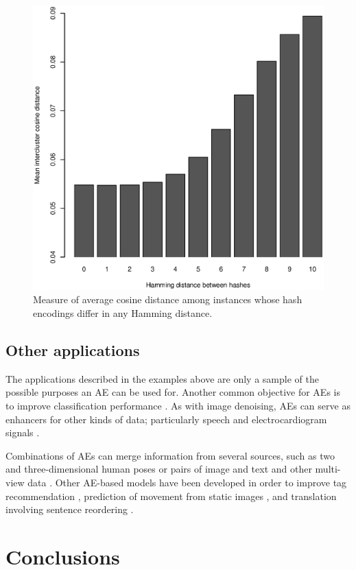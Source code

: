 \begin{figure}[ht]
    \centering
    \includegraphics[width=.75\textwidth]{hashing_intercluster.eps}
    \caption{Measure of average cosine distance among instances whose hash encodings differ in any Hamming distance.}
    \label{p4fig:hashing}
\end{figure}

\subsection{Other applications}
\label{p4sec.other}

The applications described in the examples above are only a sample of the possible purposes an AE can be used for. Another common objective for AEs is to improve classification performance \cite{ssae,xu2017}. As with image denoising, AEs can serve as enhancers for other kinds of data; particularly speech \cite{speech} and electrocardiogram signals \cite{ecg}.

Combinations of AEs can merge information from several sources, such as two and three-dimensional human poses \cite{multimodal} or pairs of image and text and other multi-view data \cite{advcae}. Other AE-based models have been developed in order to improve tag recommendation \cite{rsdae}, prediction of movement from static images \cite{uncertain}, and translation involving sentence reordering \cite{translation}.

\section{Conclusions}
\label{p4sec.conclusions}

